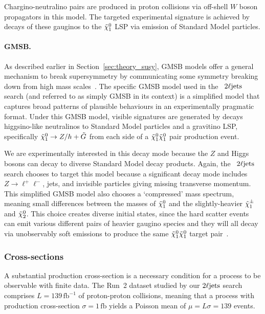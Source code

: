 Chargino-neutralino pairs are produced in proton collisions via off-shell
$W$ boson propagators in this model.
The targeted experimental signature is achieved by decays of these gauginos
to the $\tilde\chi^0_1$ LSP via emission of Standard Model particles.

\paragraph{GMSB.}
As described earlier in Section~\ref{sec:theory_susy}, GMSB models offer a
general mechanism to break supersymmetry by communicating some symmetry
breaking down from high mass scales~\cite{Meade:2008wd,SUSY-2018-02}.
The specific GMSB model used in the \atlas\ $2\ell\mathrm{jets}$ search
(and referred to as simply GMSB in its context) is a simplified model that
captures broad patterns of plausible behaviours in an experimentally pragmatic
format.
Under this GMSB model, visible signatures are generated by decays higgsino-like
neutralinos to Standard Model particles and a gravitino LSP, specifically
$\tilde\chi^0_1 \to Z/h + \tilde G$ from each side of a
$\tilde\chi^0_1 \tilde\chi^0_1$ pair production event.

We are experimentally interested in this decay mode because the $Z$ and Higgs
bosons can decay to diverse Standard Model decay products.
Again, the \atlas\ $2\ell\mathrm{jets}$ search chooses to target this model because
a significant decay mode includes $Z \to \ell^+\ell^-$, jets, and invisible
particles giving missing transverse momentum.
This simplified GMSB model also chooses a
`compressed' mass spectrum, meaning small differences between the masses of
$\tilde\chi^0_1$ and the slightly-heavier $\tilde\chi^\pm_1$ and $\tilde\chi^0_2$.
This choice creates diverse initial states, since the hard scatter events can
emit various different pairs of heavier gaugino species and they will all decay
via unobservably soft emissions to produce the same
$\tilde\chi^0_1 \tilde\chi^0_1$ target
pair~\cite{atlas2022searches,hepdata.116034}.


\subsubsection{Cross-sections}
A substantial production cross-section is a necessary condition for a process
to be observable with finite data.
The Run~2 dataset studied by our $2\ell\mathrm{jets}$ search comprises
$L = 139\,\mathrm{fb}^{-1}$
of proton-proton collisions, meaning that a process with production
cross-section $\sigma = 1\,\mathrm{fb}$
yields a Poisson mean of $\mu = L \sigma = 139$ events.

